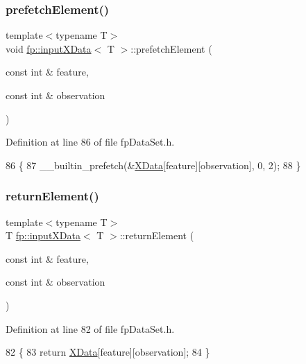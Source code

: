 \subsubsection{\texorpdfstring{prefetch\+Element()}{prefetchElement()}}
{\footnotesize\ttfamily template$<$typename T$>$ \\
void \hyperlink{classfp_1_1inputXData}{fp\+::input\+X\+Data}$<$ T $>$\+::prefetch\+Element (\begin{DoxyParamCaption}\item[{const int \&}]{feature,  }\item[{const int \&}]{observation }\end{DoxyParamCaption})\hspace{0.3cm}{\ttfamily [inline]}}



Definition at line 86 of file fp\+Data\+Set.\+h.


\begin{DoxyCode}
86                                                                                \{
87             \_\_builtin\_prefetch(&\hyperlink{classfp_1_1inputXData_ad08f8c44df38fb88799cda53cc50eaa5}{XData}[feature][observation], 0, 2);
88         \}
\end{DoxyCode}
\mbox{\label{classfp_1_1inputXData_a61344d139f038c857587e224620e48fe}} 
\subsubsection{\texorpdfstring{return\+Element()}{returnElement()}}
{\footnotesize\ttfamily template$<$typename T$>$ \\
T \hyperlink{classfp_1_1inputXData}{fp\+::input\+X\+Data}$<$ T $>$\+::return\+Element (\begin{DoxyParamCaption}\item[{const int \&}]{feature,  }\item[{const int \&}]{observation }\end{DoxyParamCaption})\hspace{0.3cm}{\ttfamily [inline]}}



Definition at line 82 of file fp\+Data\+Set.\+h.


\begin{DoxyCode}
82                                                                           \{
83             \textcolor{keywordflow}{return} \hyperlink{classfp_1_1inputXData_ad08f8c44df38fb88799cda53cc50eaa5}{XData}[feature][observation];
84         \}
\end{DoxyCode}
\mbox{\label{classfp_1_1inputXData_a8049555a9f1c77fbeba9f8ed63dca39f}} 
